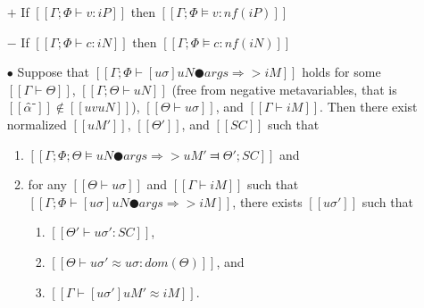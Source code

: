 \begin{lemma}
    \label{lemma:typing-completeness}
    \begin{itemize}
        \item [$+$] If $[[Γ; Φ ⊢ v : iP]]$ then  $[[Γ; Φ ⊨ v : nf(iP)]]$        
        \item [$-$] If $[[Γ; Φ ⊢ c : iN]]$ then  $[[Γ; Φ ⊨ c : nf(iN)]]$
        \item [$\bullet$] Suppose that 
            $[[Γ; Φ ⊢ [uσ]uN ● args ⇒> iM]]$ holds for some
            $[[Γ ⊢ Θ]]$,
            $[[Γ; Θ ⊢ uN]]$ (free from negative metavariables, that is $[[α̂⁻]] \notin [[uv uN]]$), 
            $[[Θ ⊢ uσ]]$, and $[[Γ ⊢ iM]]$. Then
            there exist normalized $[[uM']]$, $[[Θ']]$, and $[[SC]]$ such that
            \begin{enumerate}
                \item $[[ Γ; Φ; Θ ⊨ uN ● args ⇒> uM' ⫤ Θ'; SC ]]$ and
                \item for any $[[Θ ⊢ uσ]]$ and $[[Γ ⊢ iM]]$
                    such that $[[Γ; Φ ⊢ [uσ]uN ● args ⇒> iM]]$, 
                    there exists $[[uσ']]$ such that 
                    \begin{enumerate}
                        \item $[[Θ' ⊢ uσ' : SC]]$,
                        \item $[[Θ ⊢ uσ' ≈ uσ : dom(Θ)]]$, and 
                        \item $[[Γ ⊢ [uσ']uM' ≈ iM]]$.
                    \end{enumerate}
            \end{enumerate}
    \end{itemize}
\end{lemma}
